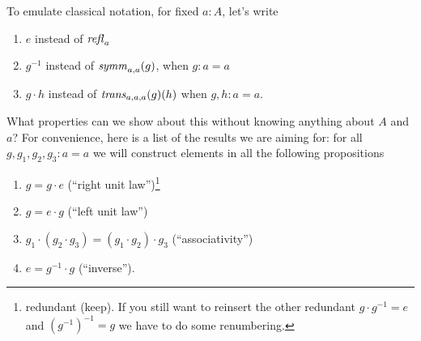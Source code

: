  To emulate classical notation, for fixed $a:A$,  %
let's write
 \begin{enumerate}
 \item $e$ instead of $\mathop{{\it refl}_{a}}{}$
 \item $g^{-1}$ instead of $\mathop{\mathit{symm}}_{a,a}(g)$, when $g:a=a$
 \item $g\cdot h$ instead of $\mathop{\mathit{trans}}_{a,a,a}(g)(h)$ when $g,h:a=a$.
 \end{enumerate}
 What properties can we show about this without knowing anything about $A$ and $a$? For convenience, here is a list of the results we are aiming for: for all $g,g_1,g_2,g_3:a=a$ we will construct elements in all the following propositions
 \begin{enumerate}
 \item $g=g\cdot e$  \qquad(``right unit law'')\footnote{redundant (keep).  If you still want to reinsert the other redundant $g\cdot g^{-1}=e$ and $(g^{-1})^{-1}=g$ we have to do some renumbering.  
}
 \item $g=e\cdot g$ \qquad(``left unit law'')
 \item $g_1\cdot(g_2\cdot g_3)=(g_1\cdot g_2)\cdot g_3$ \qquad(``associativity'')
 \item $e=g^{-1}\cdot g$ \qquad(``inverse'').
 \end{enumerate}
 

